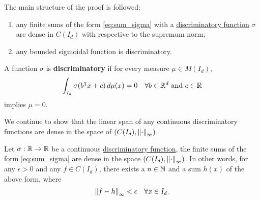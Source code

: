 The main structure of the proof is followed:
\begin{enumerate}
    \item any finite sums of the form \eqref{eq:sum_sigma} with a
    \hyperref[def:dis_func]{discriminatory function} $\sigma$ are dense in
    $C(I_d)$ with respective to the supremum norm;
    \item any bounded sigmoidal function is discriminatory.
\end{enumerate}

\begin{definition}
    \label{def:dis_func}
    A function $\sigma$ is \textbf{discriminatory} if for every measure $\mu \in
    M(I_d)$,
    \begin{equation}
        \int_{I_d} \sigma(b{}^{\intercal} x + c) \,d\mu(x) = 0 \quad 
        \forall b \in \mathbb{R}^d \textnormal{ and } c \in \mathbb{R}
    \end{equation}
    implies $\mu = 0$.
\end{definition}

We continue to show that the linear span of any continuous discriminatory
functions are dense in the space of $(C(I_d), \left\| \cdot \right\|_{\infty})$.

\begin{theorem}
    Let $\sigma: \mathbb{R} \to \mathbb{R}$ be a continuous
    \hyperref[def:dis_func]{discriminatory function}, the finite sums of the
    form \eqref{eq:sum_sigma} are dense in the space $(C(I_d),
    \left\| \cdot \right\|_{\infty})$. In other words, for any $\epsilon > 0$ and any $f
    \in C(I_d)$, there exists a $n \in \mathbb{N}$ and a sum $h(x)$ of the above form,
    where
    \begin{equation}
        \left\| f - h \right\|_{\infty} < \epsilon \quad \forall x \in I_d.
    \end{equation}
\end{theorem}

